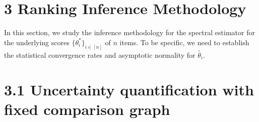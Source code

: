 


\section{3 Ranking Inference Methodology}\label{ranking-inference-methodology}

In this section, we study the inference methodology for the spectral estimator for the underlying scores \(\{\theta_{i}^{*}\}_{i\in [n]}\) of \(n\) items. To be specific, we need to establish the statistical convergence rates and asymptotic normality for \(\widetilde{\theta_{i}}\).

\section{3.1 Uncertainty quantification with fixed comparison graph}\label{uncertainty-quantification-with-fixed-comparison-graph}

